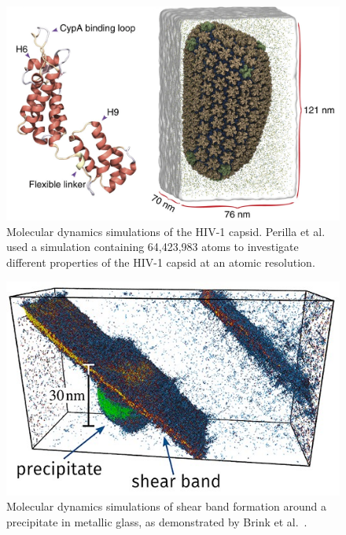 \begin{multicols*}{2}
      \begin{figure}[H]
            \centering
            \includegraphics[width=1\columnwidth, trim={0cm 0 0cm 0cm}]{figures/Intro/HIV-1.png}
            \caption{Molecular dynamics simulations of the HIV-1 capsid. Perilla et al.~\cite{Perilla2017} used a simulation containing 64,423,983 atoms to investigate different properties of the HIV-1 capsid at an atomic resolution.}
            \label{fig:hiv_capsid}
      \end{figure}

      \begin{figure}[H]
            \centering
            \includegraphics[width=0.9\columnwidth,trim={0cm 0 0cm 0cm}]{figures/Intro/metallic-glass-crack.jpg}
            \caption{Molecular dynamics simulations of shear band formation around a precipitate in metallic glass, as demonstrated by Brink et al.~\cite{Brink2016}.}
            \label{fig:md_simulation_loop}
      \end{figure}
\end{multicols*}

